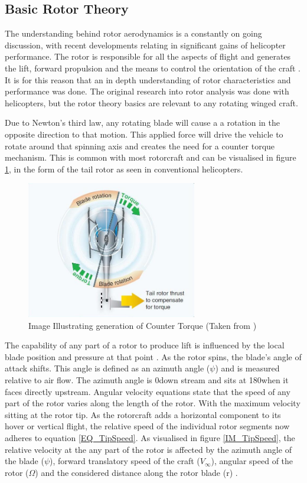 \subsection{Basic Rotor Theory}
The understanding behind rotor aerodynamics is a constantly on going discussion, with recent developments relating in significant gains of helicopter performance. The rotor is responsible for all the aspects of flight and generates the lift, forward propulsion and the means to control the orientation of the craft \cite{Leishman}. It is for this reason that an in depth understanding of rotor characteristics and performance was done. The original research into rotor analysis was done with helicopters, but the rotor theory basics are relevant to any rotating winged craft.

Due to Newton's third law, any rotating blade will cause a a rotation in the opposite direction to that motion. This applied force will drive the vehicle to rotate around that spinning axis and creates the need for a counter torque mechanism. This is common with most rotorcraft and can be visualised in figure \ref{IM_Antitorque}, in the form of the tail rotor as seen in conventional helicopters.

\begin{figure}[H]
\centering
\includegraphics[height = 6cm]{Images/Literature/AntiTorque}
\caption{Image Illustrating generation of Counter Torque (Taken from \cite{Heli})}
\label{IM_Antitorque}
\end{figure}

The capability of any part of a rotor to produce lift is influenced by the local blade position and pressure at that point \cite{Leishman}.
As the rotor spins, the blade's angle of attack shifts. This angle is defined as an azimuth angle ($\psi$) and is measured relative to air flow. The azimuth angle is 0\textdegree down stream and sits at 180\textdegree when it faces directly upstream.
Angular velocity equations state that the speed of any part of the rotor varies along the length of the rotor. With the maximum velocity sitting at the rotor tip. As the rotorcraft adds a horizontal component to its hover or vertical flight, the relative speed of the individual rotor segments now adheres to equation \eqref{EQ_TipSpeed}. As visualised in figure \ref{IM_TipSpeed}, the relative velocity at the any part of the rotor is affected by the azimuth angle of the blade ($\psi$), forward translatory speed of the craft ($V_{\infty}$), angular speed of the rotor ($\Omega$) and the considered distance along the rotor blade (r) \cite{Leishman} \cite{RotorCraftHand}. 

